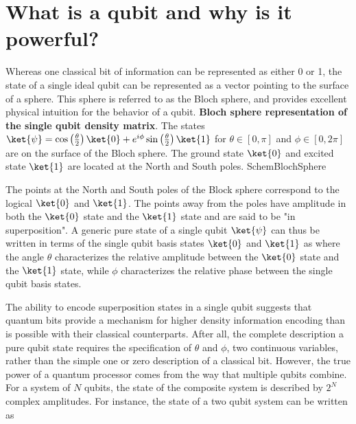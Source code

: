 \section{What is a qubit and why is it powerful?}
Whereas one classical bit of information can be represented as either 0 or 1, the state of a single ideal qubit can be represented as a vector pointing to the surface of a sphere.
This sphere is referred to as the Bloch sphere, and provides excellent physical intuition for the behavior of a qubit.
{\textbf{Bloch sphere representation of the single qubit density matrix}.
The states $\ket{\psi} = \cos \left( \frac{\theta}{2} \right) \ket{0} + e^{i \phi} \sin \left( \frac{\theta}{2} \right)\ket{1}$ for
$\theta \in [0, \pi]$ and $\phi \in [0, 2 \pi]$ are on the surface of the Bloch sphere.
The ground state $\ket{0}$ and excited state $\ket{1}$ are located at the North and South poles.
}
{SchemBlochSphere}

The points at the North and South poles of the Block sphere correspond to the logical $\ket{0}$ and $\ket{1}$.
The points away from the poles have amplitude in both the $\ket{0}$ state and the $\ket{1}$ state and are said to be "in superposition".
A generic pure state of a single qubit $\ket{\psi}$ can thus be written in terms of the single qubit basis states $\ket{0}$ and $\ket{1}$ as
where the angle $\theta$ characterizes the relative amplitude between the $\ket{0}$ state and the $\ket{1}$ state, while $\phi$ characterizes the relative phase between the single qubit basis states.

The ability to encode superposition states in a single qubit suggests that quantum bits provide a mechanism for higher density information encoding than is possible with their classical counterparts.
After all, the complete description a pure qubit state requires the specification of $\theta$ and $\phi$, two continuous variables,
rather than the simple one or zero description of a classical bit.
However, the true power of a quantum processor comes from the way that multiple qubits combine.
For a system of $N$ qubits, the state of the composite system is described by $2^N$ complex amplitudes.
For instance, the state of a two qubit system can be written as

